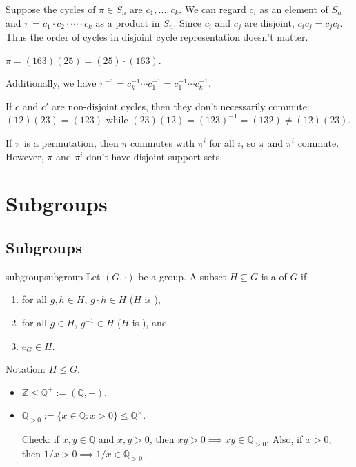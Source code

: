 \documentclass[12pt,letterpaper]{report}
\begin{document}
Suppose the cycles of $\pi \in S_n$ are $c_1, \ldots, c_k$.
We can regard $c_i$ as an element of $S_n$ and $\pi = c_1 \cdot c_2 \cdot \cdots \cdot c_k$ as a
product in $S_n$.
Since $c_i$ and $c_j$ are disjoint, $c_i c_j = c_j c_i$.
Thus the order of cycles in disjoint cycle representation doesn't matter.

\begin{ex}
  $\pi = (163)(25) = (25) \cdot (163)$.
\end{ex}

Additionally, we have $\pi^{-1} = c_k^{-1} \cdots c_1^{-1} = c_1^{-1} \cdots c_k^{-1}$.

\begin{ex}
  If $c$ and $c'$ are non-disjoint cycles, then they don't necessarily commute:
  $(12)(23) = (123)$ while $(23)(12) = (123)^{-1} = (132) \neq (12)(23)$.
\end{ex}

If $\pi$ is a permutation, then $\pi$ commutes with $\pi^i$ for all $i$, so $\pi$ and $\pi^i$
commute.
However, $\pi$ and $\pi^i$ don't have disjoint support sets.


\section{Subgroups}

\subsection{Subgroups}

\begin{defn}{subgroup}{subgroup}
  Let $(G, \cdot)$ be a group.
  A subset $H \subseteq G$ is a  of $G$ if
  \begin{enumerate}
    \item for all $g, h \in H$, $g \cdot h \in H$ ($H$ is ),
    \item for all $g \in H$, $g^{-1} \in H$ ($H$ is ), and
    \item $e_G \in H$.
  \end{enumerate}

  Notation: $H \leq G$.
\end{defn}

\begin{ex}
  \begin{itemize}
    \item $\mathbb{Z} \leq \mathbb{Q}^+ := (\mathbb{Q}, +)$.
    \item $\mathbb{Q}_{> 0} := \{ x \in \mathbb{Q} : x > 0 \} \leq \mathbb{Q}^\times$.

    Check: if $x, y \in \mathbb{Q}$ and $x, y > 0$, then $xy > 0 \implies xy \in \mathbb{Q}_{> 0}$.
    Also, if $x > 0$, then $1/x > 0 \implies 1/x \in \mathbb{Q}_{> 0}$.
  \end{itemize}
\end{ex}
\end{document}
